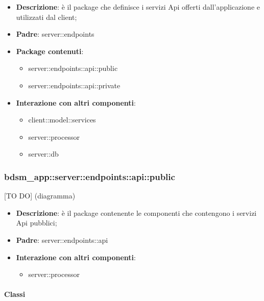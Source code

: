 \begin{itemize}
  \item \textbf{Descrizione}: è il package che definisce i servizi Api offerti dall'applicazione e utilizzati dal client;
  \item \textbf{Padre}: server::endpoints
  \item \textbf{Package contenuti}:
  	\begin{itemize}
  		\item server::endpoints::api::public
  		\item server::endpoints::api::private
	\end{itemize}
  \item \textbf{Interazione con altri componenti}:
  	\begin{itemize}
  		\item client::model::services
  		\item server::processor
  		\item server::db
	\end{itemize}
\end{itemize}

\subsubsection{bdsm\_app::server::endpoints::api::public} %
\label{ssub:bdsm_app_server_endpoints_api_public}
[TO DO] (diagramma) \newline \newline

\begin{itemize}
  \item \textbf{Descrizione}: è il package contenente le componenti che contengono i servizi Api pubblici;
  \item \textbf{Padre}: server::endpoints::api
  \item \textbf{Interazione con altri componenti}:
  	\begin{itemize}
        \item server::processor
    \end{itemize}
\end{itemize}

	\paragraph{Classi} %


